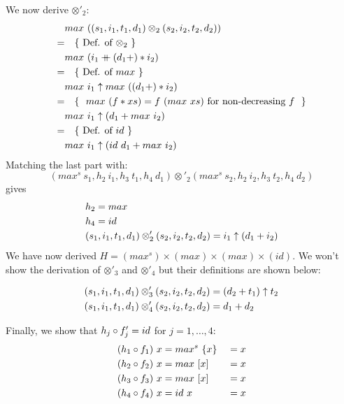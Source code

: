 \documentclass{article}
\begin{document}
We now derive $\otimes'_2$:
\begin{align*}
      & max\ ((s_1,i_1,t_1,d_1) \otimes_2 (s_2,i_2,t_2,d_2))    \\
    = & \quad \{\ \text{Def. of $\otimes_2$}\ \}                \\
      & max\ (i_1 \mathbin{+\mkern-10mu+} (d_1 +) \mathbin{\ast} i_2)                     \\
    = & \quad \{\ \text{Def. of $max$}\ \}                      \\
      & max\ i_1 \uparrow max\ ((d_1 +) \mathbin{\ast} i_2)                 \\
    = & \quad \{\ \text{
            $max\ (f \mathbin{\ast} xs) = f\ (max\ xs)$
            for non-decreasing $f$
        }\ \}                                                   \\
      & max\ i_1 \uparrow (d_1 + max\ i_2)                        \\
    = & \quad \{\ \text{Def. of $id$}\ \}                       \\
      & max\ i_1 \uparrow (id\ d_1 + max\ i_2)                    \\
\end{align*}
Matching the last part with:
\[
    (max^s\ s_1, h_2\ i_1, h_3\ t_1, h_4\ d_1) \otimes'_2
    (max^s\ s_2, h_2\ i_2, h_3\ t_2, h_4\ d_2)
\]
gives
\begin{align*}
    & h_2 = max \\
    & h_4 = id  \\
    & (s_1, i_1, t_1, d_1) \otimes'_2
      (s_2, i_2, t_2, d_2)
    = i_1 \uparrow (d_1 + i_2)
\end{align*}
We have now derived $H = (max^s) \times (max) \times (max) \times (id)$.
We won't show the derivation of $\otimes'_3$ and $\otimes'_4$ but their
definitions are shown below:

\begin{align*}
    (s_1, i_1, t_1, d_1)
    \otimes'_3
    (s_2, i_2, t_2, d_2)
    &= (d_2 + t_1) \uparrow t_2   \\
    (s_1, i_1, t_1, d_1)
    \otimes'_4
    (s_2, i_2, t_2, d_2)
    &= d_1 + d_2                \\
\end{align*}

Finally, we show that $h_j \mathbin{\circ} f'_j = id$ for $j = 1, \ldots , 4$:
\begin{alignat*}{2}
    (h_1 \mathbin{\circ} f_1)\ x &= max^s\ \{ x \} \ &= x \\
    (h_2 \mathbin{\circ} f_2)\ x &= max\     [x]   \ &= x \\
    (h_3 \mathbin{\circ} f_3)\ x &= max\     [x]   \ &= x \\
    (h_4 \mathbin{\circ} f_4)\ x &= id\       x    \ &= x \\
\end{alignat*}
\end{document}
